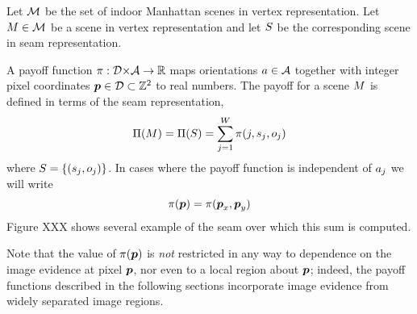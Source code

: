 Let $\SetOfScenes$ be the set of indoor Manhattan scenes in vertex
representation. Let $\Scene\in\SetOfScenes$ be a scene in vertex
representation and let $\Seam$ be the corresponding scene in
seam representation. 

A payoff function $\PixelPayoff: \Dom\cross\SetOfOrientations
\Mapto\Reals$ maps orientations $\Orient\in\SetOfOrientations$
together with integer pixel coordinates $\Pixel\in\Dom\subset\Ints^2$
to real numbers. The payoff for a scene $\Scene$ is defined in terms
of the seam representation,
\begin{equation}
  \label{eq:scene-payoff}
  \ScenePayoff(\Scene) = 
  \ScenePayoff(\Seam) =
  \sum_{j=1}^{\Width} \PixelPayoff(j,\seam_j,\WallOrient_j)
\end{equation}
where $\Seam = \{(\seam_j,\WallOrient_j)\}$. In cases where the payoff
function is independent of $\Orient_j$ we will write
\begin{equation}
  \PixelPayoff(\Pixel) = \PixelPayoff(\Pixel_x,\Pixel_y)
\end{equation}
Figure XXX shows several example of the seam over which this sum is
computed.

Note that the value of $\PixelPayoff(\Pixel)$ is \textit{not}
restricted in any way to dependence on the image evidence at pixel
$\Pixel$, nor even to a local region about $\Pixel$; indeed, the
payoff functions described in the following sections incorporate image
evidence from widely separated image regions.


